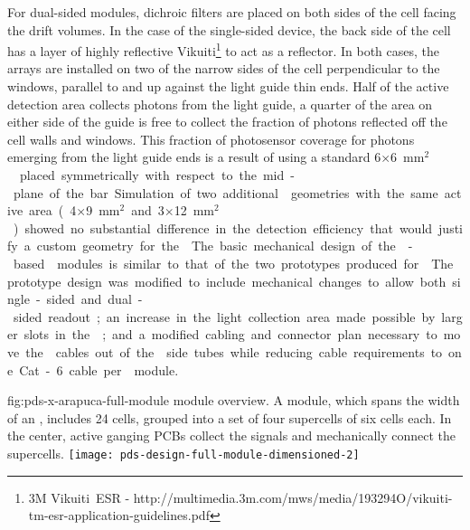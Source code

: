 For dual-sided  modules, dichroic filters are placed on both sides of the cell facing the drift volumes.  In the case of the single-sided device, the back side of the cell has a layer of highly reflective Vikuiti\footnote{3M Vikuiti\texttrademark\  ESR - http://multimedia.3m.com/mws/media/193294O/vikuiti-tm-esr-application-guidelines.pdf} to act as a  reflector.  In both cases, the  arrays are installed on two of the narrow sides of the cell perpendicular to the windows, parallel to and up against the light guide thin ends. Half of the  active detection area collects photons from the light guide, a quarter of the area on either side of the guide is free to collect the fraction of photons reflected off the cell walls and windows. 
This fraction of photosensor coverage for photons emerging from the light guide ends is a result of using a standard \num{6}$\times$\SI{6}{mm$^2$}  placed symmetrically with respect to the mid-plane of the bar. Simulation of two additional  geometries with the same active area (\num{4}$\times$\SI{9}{mm$^2$} and \num{3}$\times$\SI{12}{mm$^2$}) showed no substantial difference in the detection efficiency that would justify a custom geometry for the .

The basic mechanical design of the -based  modules is similar to that of the two prototypes produced for . %
The prototype design was modified to include mechanical changes to allow both single-sided and dual-sided readout; an increase in the light collection area made possible by larger slots in the ; and a modified cabling and connector plan necessary to move the  cables out of the  side tubes while reducing cable requirements to one Cat-6 cable per  module.

\begin{dunefigure}
{fig:pds-x-arapuca-full-module}
{ module overview. A module, which spans the width of an , includes 24
  cells, grouped into a set of four supercells of six cells each. In the center, active ganging PCBs collect the signals and mechanically connect the supercells.}
   \texttt{[image: pds-design-full-module-dimensioned-2]}
\end{dunefigure}

